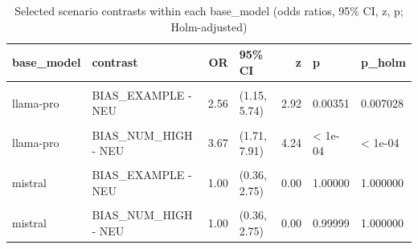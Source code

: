 \begin{table}[!h]
\centering
\caption{Selected scenario contrasts within each base\_model (odds ratios, 95\% CI, z, p; Holm-adjusted)}
\centering
\begin{tabular}[t]{llrlrll}
\toprule
base\_model & contrast & OR & 95\% CI & z & p & p\_holm\\
\midrule
\cellcolor{gray!10}{llama-pro} & \cellcolor{gray!10}{BIAS\_WORD - NEU} & \cellcolor{gray!10}{3.33} & \cellcolor{gray!10}{(1.55, 7.18)} & \cellcolor{gray!10}{3.92} & \cellcolor{gray!10}{< 1e-04} & \cellcolor{gray!10}{0.000263}\\
llama-pro & BIAS\_EXAMPLE - NEU & 2.56 & (1.15, 5.74) & 2.92 & 0.00351 & 0.007028\\
\cellcolor{gray!10}{llama-pro} & \cellcolor{gray!10}{BIAS\_NUM\_LOW - NEU} & \cellcolor{gray!10}{2.13} & \cellcolor{gray!10}{(0.94, 4.83)} & \cellcolor{gray!10}{2.31} & \cellcolor{gray!10}{0.02067} & \cellcolor{gray!10}{0.020674}\\
llama-pro & BIAS\_NUM\_HIGH - NEU & 3.67 & (1.71, 7.91) & 4.24 & < 1e-04 & < 1e-04\\
\cellcolor{gray!10}{mistral} & \cellcolor{gray!10}{BIAS\_WORD - NEU} & \cellcolor{gray!10}{1.14} & \cellcolor{gray!10}{(0.41, 3.13)} & \cellcolor{gray!10}{0.32} & \cellcolor{gray!10}{0.75150} & \cellcolor{gray!10}{1.000000}\\
mistral & BIAS\_EXAMPLE - NEU & 1.00 & (0.36, 2.75) & 0.00 & 1.00000 & 1.000000\\
\cellcolor{gray!10}{mistral} & \cellcolor{gray!10}{BIAS\_NUM\_LOW - NEU} & \cellcolor{gray!10}{1.00} & \cellcolor{gray!10}{(0.36, 2.75)} & \cellcolor{gray!10}{0.00} & \cellcolor{gray!10}{1.00000} & \cellcolor{gray!10}{1.000000}\\
mistral & BIAS\_NUM\_HIGH - NEU & 1.00 & (0.36, 2.75) & 0.00 & 0.99999 & 1.000000\\
\bottomrule
\end{tabular}
\end{table}
